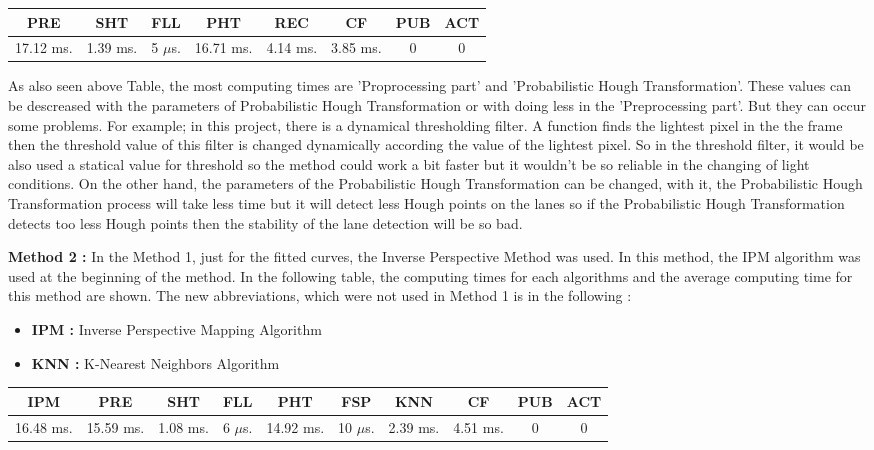 \begin{center}
  \begin{tabular}{ | c | c | c | c | c | c | c | c |}
    \hline
  
  PRE & SHT & FLL & PHT & REC & CF & PUB & ACT \\ \hline  
  17.12 ms. & 1.39 ms. & 5 $\mu$s. & 16.71 ms. & 4.14 ms. & 3.85 ms. & 0 & 0 \\ \hline  
    
    
      \end{tabular}
  \label{tab:Case1_Times}
\end{center}

As also seen above Table, the most computing times are 'Proprocessing part' and 'Probabilistic Hough Transformation'. These values can be descreased with the parameters of Probabilistic Hough Transformation or with doing less in the 'Preprocessing part'. But they can occur some problems. For example; in this project, there is a dynamical thresholding filter. A function finds the lightest pixel in the the frame then the threshold value of this filter is changed dynamically according the value of the lightest pixel. So in the threshold filter,  it would be also used a statical value for threshold so the method could work a bit faster but it wouldn't be so reliable in the changing of light conditions. On the other hand, the parameters of the Probabilistic Hough Transformation can be changed, with it, the Probabilistic Hough Transformation process will take less time but it will detect less Hough points on the lanes so if the Probabilistic Hough Transformation detects too less Hough points then the stability of the lane detection will be so bad.




\textbf{Method 2 : }In the Method 1, just for the fitted curves, the Inverse Perspective Method was used. In this method, the IPM algorithm was used at the beginning of the method. In the following table, the computing times for each algorithms and the average computing time for this method are shown. The new abbreviations, which were not used in Method 1 is in the following :


\begin{itemize}[noitemsep]
\item\textbf{IPM : }Inverse Perspective Mapping Algorithm
\item\textbf{KNN : }K-Nearest Neighbors Algorithm
\end{itemize}

\begin{center}
  \begin{tabular}{ | c | c | c | c | c | c | c | c | c | c |}
    \hline
  
  IPM 		& PRE 		& SHT	   & FLL 	   & PHT 	   & FSP 	    & KNN 	   & CF 	  & PUB 	& ACT \\ \hline  
  16.48 ms. & 15.59 ms. & 1.08 ms. & 6 $\mu$s. & 14.92 ms. & 10 $\mu$s. & 2.39 ms. & 4.51 ms. & 0       & 0   \\ \hline  
    
    
      \end{tabular}
  \label{tab:Case1_Times}
\end{center}

